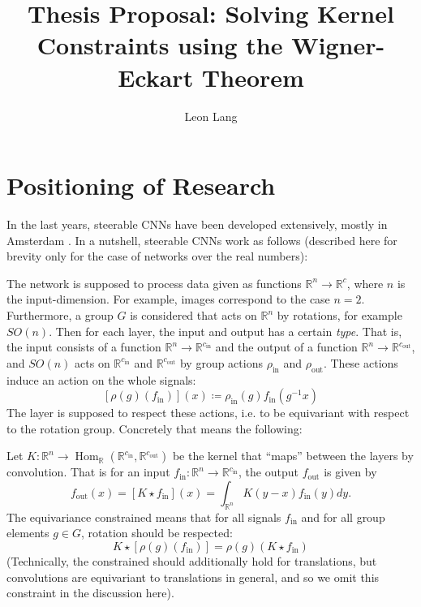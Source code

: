 \documentclass[12pt, a4paper]{article}
\title{Thesis Proposal: Solving Kernel Constraints using the Wigner-Eckart Theorem}
\date{}
\author{Leon Lang}
\theoremstyle{plain}
\theoremstyle{definition}
\theoremstyle{remark}
\newcommand{\R}{\mathds{R}}
\DeclareMathOperator{\Hom}{Hom}
\DeclareMathOperator{\inn}{in}
\DeclareMathOperator{\out}{out}
\begin{document}
\maketitle

\tableofcontents

\section{Positioning of Research}

In the last years, steerable CNNs have been developed extensively, mostly in Amsterdam \cite{cohen2016steerable}  \cite{general_theory} \cite{3d_cnns} \cite{gauge_cnns} \cite{general_e2_cnns}. In a nutshell, steerable CNNs work as follows (described here for brevity only for the case of networks over the real numbers):

The network is supposed to process data given as functions $\R^n \to \R^{c}$, where $n$ is the input-dimension. For example, images correspond to the case $n = 2$. Furthermore, a group $G$ is considered that acts on $\R^n$ by rotations, for example $SO(n)$. Then for each layer, the input and output has a certain \emph{type}. That is, the input consists of a function $\R^n \to \R^{c_{\inn}}$ and the output of a function $\R^n \to \R^{c_{\out}}$, and $SO(n)$ acts on $\R^{c_{\inn}}$ and $\R^{c_{\out}}$ by group actions $\rho_{\inn}$ and $\rho_{\out}$. These actions induce an action on the whole signals:
\begin{equation*}
\left[ \rho(g)(f_{\inn})\right](x) \coloneq \rho_{\inn}(g) f_{\inn} (g^{-1}x)
\end{equation*}
The layer is supposed to respect these actions, i.e. to be equivariant with respect to the rotation group. Concretely that means the following:

Let $K: \R^n \to \Hom_{\R}(\R^{c_{\inn}}, \R^{c_{\out}})$ be the kernel that ``maps'' between the layers by convolution. That is for an input $f_{\inn}: \R^{n} \to \R^{c_{\inn}}$, the output $f_{\out}$ is given by
\begin{equation*}
f_{\out}(x) = \left[ K \star f_{\inn}\right](x) = \int_{\R^n} K(y - x) f_{\inn}(y) dy.
\end{equation*}
The equivariance constrained means that for all signals $f_{\inn}$ and for all group elements $g \in G$, rotation should be respected:
\begin{equation*}
K \star \left[ \rho(g)(f_{\inn}) \right] = \rho(g) \left( K \star f_{\inn} \right)
\end{equation*}
(Technically, the constrained should additionally hold for translations, but convolutions are equivariant to translations in general, and so we omit this constraint in the discussion here).
\end{document}
